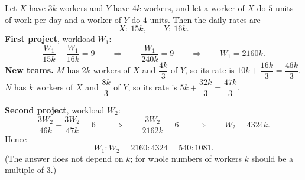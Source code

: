 Let $X$ have $3k$ workers and $Y$ have $4k$ workers, and let a worker of $X$ do $5$ units of work per day and a worker of $Y$ do $4$ units. Then the daily rates are
\[
X:\ 15k,\qquad Y:\ 16k .
\]
\textbf{First project}, workload $W_1$:
\[
\dfrac{W_1}{15k}-\dfrac{W_1}{16k}=9\qquad\Longrightarrow\qquad\dfrac{W_1}{240k}=9\qquad\Longrightarrow\qquad W_1=2160k .
\]
\textbf{New teams.} $M$ has $2k$ workers of $X$ and $\dfrac{4k}{3}$ of $Y$, so its rate is $10k+\dfrac{16k}{3}=\dfrac{46k}{3}$. $N$ has $k$ workers of $X$ and $\dfrac{8k}{3}$ of $Y$, so its rate is $5k+\dfrac{32k}{3}=\dfrac{47k}{3}$.

\textbf{Second project}, workload $W_2$:
\[
\dfrac{3W_2}{46k}-\dfrac{3W_2}{47k}=6\qquad\Longrightarrow\qquad\dfrac{3W_2}{2162k}=6\qquad\Longrightarrow\qquad W_2=4324k .
\]
Hence
\[
W_1:W_2=2160:4324=\boxed{540:1081}.
\]
(The answer does not depend on $k$; for whole numbers of workers $k$ should be a multiple of $3$.)
